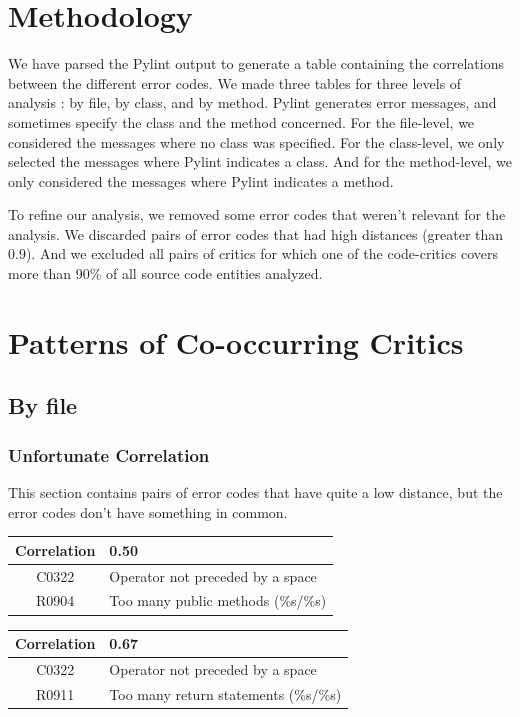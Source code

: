 \documentclass[12pt, a4paper]{article}
\newcommand{\tbf}[1]{\textbf{#1}}
\newcommand{\noi}{\noindent}
\newcommand{\pyl}{\textsf{Pylint}}
\begin{document}
\section{Methodology}

We have parsed the \pyl{} output to generate a table containing the correlations between the different error codes.
We made three tables for three levels of analysis : by file, by class, and by method.
\pyl{} generates error messages, and sometimes specify the class and the method concerned.
For the file-level, we considered the messages where no class was specified.
For the class-level, we only selected the messages where \pyl{} indicates a class.
And for the method-level, we only considered the messages where \pyl{} indicates a method.

\bigskip
To refine our analysis, we removed some error codes that weren't relevant for the analysis.
We discarded pairs of error codes that had high distances (greater than 0.9).
And we excluded all pairs of critics for which one of the code-critics covers more than 90\% of all source code entities analyzed.



\section{Patterns of Co-occurring Critics}

\subsection{By file}

\subsubsection*{Unfortunate Correlation}

This section contains pairs of error codes that have quite a low distance, but the error codes don't have something in common.

\bigskip \noi
\begin{tabularx}{\textwidth}{|c|X|}
\hline
\tbf{Correlation}		& 0.50 \\
\hline
C0322		& Operator not preceded by a space \\
\hline
R0904		& Too many public methods (\%s/\%s) \\
\hline
\end{tabularx}

\bigskip \noi
\begin{tabularx}{\textwidth}{|c|X|}
\hline
\tbf{Correlation}		& 0.67 \\
\hline
C0322		& Operator not preceded by a space \\
\hline
R0911		& Too many return statements (\%s/\%s) \\
\hline
\end{tabularx}
\end{document}
